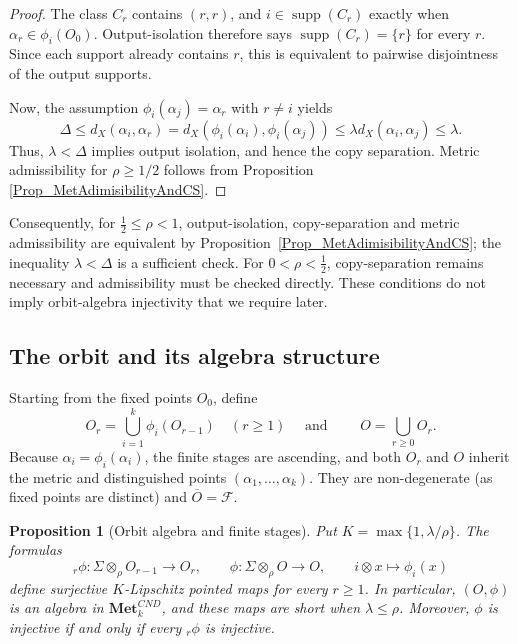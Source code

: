 \documentclass{sn-jnl}%
\theoremstyle{thmstyleone}%
\newtheorem{proposition}[theorem]{Proposition}%
\theoremstyle{thmstyletwo}%
\theoremstyle{thmstylethree}%
\newcommand{\mcnd}{\mathbf{Met}_{k}^{CND}}
\newcommand{\M}{\Sigma}
\newcommand{\Fw}{\M\otimes_{\w}}
\newcommand{\f}{\phi}
\newcommand{\w}{\rho}
\begin{document}
\begin{proof}
The class $C_r$ contains $(r,r)$, and $i\in\operatorname{supp}(C_r)$ exactly when $\alpha_r\in\f_i(O_0)$. Output-isolation therefore says $\operatorname{supp}(C_r)=\{r\}$ for every $r$. Since each support already contains $r$, this is equivalent to pairwise disjointness of the output supports.

Now, the assumption $\f_i(\alpha_j)=\alpha_r$ with $r\ne i$ yields \begin{equation} 
\nonumber
    \Delta\leq d_X(\alpha_i,\alpha_r) = d_X(\f_i(\alpha_i),\f_i(\alpha_j))  \leq\lambda d_X(\alpha_i,\alpha_j)\leq\lambda.
\end{equation}
Thus, $\lambda < \Delta$ implies output isolation, and hence the copy separation. Metric admissibility for $\w \geq 1/2$ follows from Proposition \ref{Prop_MetAdimisibilityAndCS}.
\end{proof}

Consequently, for $\frac12\leq\rho<1$, output-isolation, copy-separation and metric admissibility are equivalent by Proposition~\ref{Prop_MetAdimisibilityAndCS}; the inequality $\lambda<\Delta$ is a sufficient check. For $0<\rho<\frac12$, copy-separation remains necessary and admissibility must be checked directly. These conditions do not imply orbit-algebra injectivity that we require later.

\subsection{The orbit and its algebra structure}
\label{subsec_OrbithAndAlgebraStructure}
Starting from the fixed points $O_0$, define
\begin{equation} 
\nonumber
    O_r=\bigcup_{i=1}^k\f_i(O_{r-1})\quad(r\geq1) \quad \text{ and } \qquad O=\bigcup_{r\geq0}O_r.
\end{equation}
Because $\alpha_i=\f_i(\alpha_i)$, the finite stages are ascending, and both $O_r$ and $O$ inherit the metric and distinguished points $(\alpha_1,\ldots,\alpha_k)$. They are non-degenerate (as fixed points are distinct) and $\overline O=\mathcal F$.

\begin{proposition}[Orbit algebra and finite stages]
\label{prop_OrbithAlgebraAndFiniteStages}
    Put $K=\max\{1,\lambda/\rho\}$. The formulas
    \begin{equation} 
    \nonumber
        {}_r\f:\Fw O_{r-1}\to O_r, \qquad \f:\Fw O\to O,\qquad i\otimes x\longmapsto\f_i(x)
    \end{equation}
    define surjective $K$-Lipschitz pointed maps for every $r\geq1$. In particular, $(O,\f)$ is an algebra in $\mcnd$, and these maps are short when $\lambda\leq\rho$. Moreover, $\f$ is injective if and only if every $ {}_r\f$ is injective.
\end{proposition}
\end{document}
